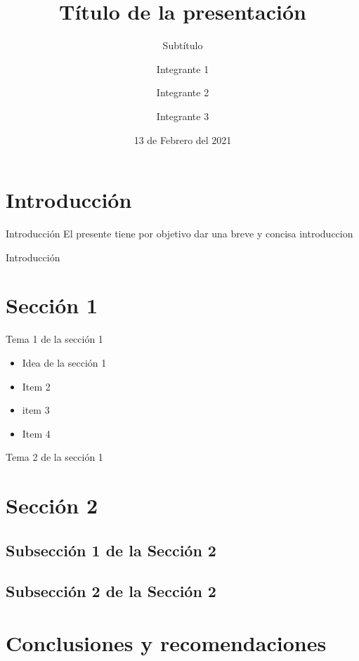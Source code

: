 \documentclass{beamer}
\title{Título de la presentación}
\subtitle{Subtítulo} %
\author{Integrante 1 \and Integrante 2 \and Integrante 3}
\institute[E.P.N]{Escuela Politécnica Nacional \par Facultad de Ingeniería en Sistemas \par Nombre de la materia}
\date{13 de Febrero del 2021} %
\begin{document}
    \frame{\titlepage}

    \frame{\tableofcontents}


    \section{Introducción}
    \begin{frame}{Introducción}
        El presente tiene por objetivo dar una breve y concisa introduccion
    \end{frame}
    \begin{frame}{Introducción}
    \end{frame}


    \section{Sección 1}
    \begin{frame}{Tema 1 de la sección 1}
	    \begin{itemize}
            \item Idea de la sección 1
            \item Item 2
            \item item 3
            \item Item 4
        \end{itemize}
    \end{frame}
    \begin{frame}{Tema 2 de la sección 1}
    \end{frame}


    \section{Sección 2}
    \subsection{Subsección 1 de la Sección 2}
    \subsection{Subsección 2 de la Sección 2}


    \section{Conclusiones y recomendaciones}
\end{document}
